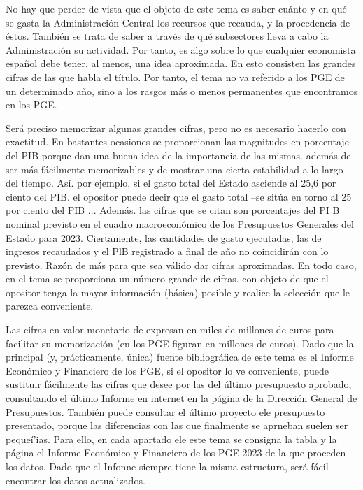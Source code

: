 \documentclass[10pt,a4paper]{article}
\begin{document}
No hay que perder de vista que el objeto de este tema es saber cuánto y en qué se gasta la Administración Central los recursos que recauda, y la procedencia de éstos. También se trata de saber a través de qué subsectores lleva a cabo la Administración su actividad. Por tanto, es algo sobre lo que cualquier economista español debe tener, al menos, una idea aproximada. En esto consisten las grandes cifras de las que habla el título. Por tanto, el tema no va referido a los PGE de un determinado año, sino a los rasgos más o menos permanentes que encontramos en los PGE. 

Será preciso memorizar algunas grandes cifras, pero no es necesario hacerlo con exactitud. En bastantes ocasiones se proporcionan las magnitudes en porcentaje del PIB porque dan una buena idea de la importancia de las mismas. además de ser más fácilmente memorizables y de mostrar una cierta estabilidad a lo largo del tiempo. Así. por ejemplo, si el gasto total del Estado asciende al 25,6 por ciento del PIB. el opositor puede decir que el gasto total --se sitúa en torno al 25 por ciento del PIB ... Además. las cifras que se citan son porcentajes del PI B nominal previsto en el cuadro macroeconómico de los Presupuestos Generales del Estado para 2023. Ciertamente, las cantidades de gasto ejecutadas, las de ingresos recaudados y el PlB registrado a final de año no coincidirán con lo previsto. Razón de más para que sea válido dar cifras aproximadas. En todo caso, en el tema se proporciona un número grande de cifras. con objeto de que el opositor tenga la mayor información (básica) posible y realice la selección que le parezca conveniente. 

Las cifras en valor monetario de expresan en miles de millones de euros para facilitar su memorización (en los PGE figuran en millones de euros). Dado que la principal (y, prácticamente, única) fuente bibliográfica de este tema es el Informe Económico y Financiero de los PGE, si el opositor lo ve conveniente, puede sustituir fácilmente las cifras que desee por las del último presupuesto aprobado, consultando el último Informe en internet en la página de la Dirección General de Presupuestos. También puede consultar el último proyecto ele presupuesto presentado, porque las diferencias con las que finalmente se aprneban suelen ser pequeí'ias. Para ello, en cada apartado ele este tema se consigna la tabla y la página el Informe Económico y Financiero de los PGE 2023 de la que proceden los datos. Dado que el Infonne siempre tiene la misma estructura, será fácil encontrar los datos actualizados.
\end{document}

